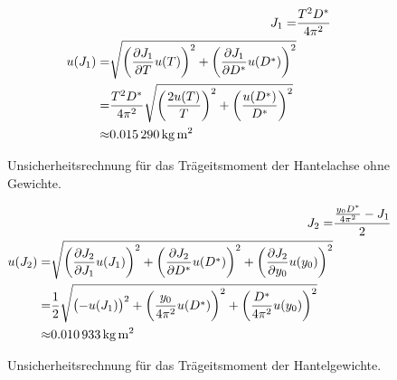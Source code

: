 \documentclass[11pt,a4paper,titlepage, ngerman]{article}
\begin{document}
	\begin{figure}[h]
		\centering
		\begin{align}
		J_1 =& \frac{T^2 D^*}{4\pi^2}\\
		\begin{split}
		\label{eq:hantel-J1-unc}
		u(J_1) =& \sqrt{\left( \pdv{J_1}{T} u(T) \right) ^2 + \left( \pdv{J_1}{D^*} u(D^*) \right) ^2}\\
		=& \frac{T^2 D^*}{4\pi^2} \sqrt{\left( \frac{2 u(T)}{T} \right) ^2 + \left( \frac{u(D^*)}{D^*} \right)^2}\\
		\approx & \SI{0,015290}{\kilogram\meter\squared}
		\end{split}
		\end{align}
		\caption{Unsicherheitsrechnung für das Trägeitsmoment der Hantelachse ohne Gewichte.}
	\end{figure}
	
	\begin{figure}[h]
		\centering
		\begin{align}
		J_2 =& \frac{\frac{y_0 D^*}{4 \pi^2} - J_1}{2}\\
		\begin{split}
		\label{eq:hantel-J2-unc}
		u(J_2) =& \sqrt{\left( \pdv{J_2}{J_1} u(J_1) \right) ^2 + \left( \pdv{J_2}{D^*} u(D^*) \right) ^2 + \left( \pdv{J_2}{y_0} u(y_0) \right) ^2}\\
		=& \frac{1}{2} \sqrt{\left( -u(J_1) \right) ^2 + \left( \frac{y_0}{4\pi^2} u(D^*) \right) ^2 + \left( \frac{D^*}{4\pi^2} u(y_0) \right) ^2}\\
		\approx & \SI{0,010933}{\kilogram\meter\squared}
		\end{split}
		\end{align}
		\caption{Unsicherheitsrechnung für das Trägeitsmoment der Hantelgewichte.}
	\end{figure}
\end{document}
